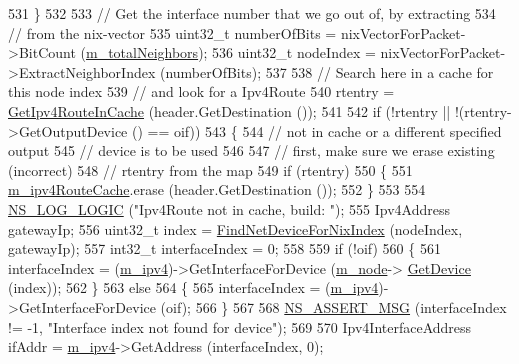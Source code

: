 \begin{DoxyCode}
531         \}
532 
533       \textcolor{comment}{// Get the interface number that we go out of, by extracting}
534       \textcolor{comment}{// from the nix-vector}
535       uint32\_t numberOfBits = nixVectorForPacket->BitCount (\hyperlink{classns3_1_1Ipv4NixVectorRouting_a96620dedcc6c052265c3c53aa14e4f6b}{m\_totalNeighbors});
536       uint32\_t nodeIndex = nixVectorForPacket->ExtractNeighborIndex (numberOfBits);
537 
538       \textcolor{comment}{// Search here in a cache for this node index }
539       \textcolor{comment}{// and look for a Ipv4Route}
540       rtentry = \hyperlink{classns3_1_1Ipv4NixVectorRouting_a1d352caa92d6d91e6cb94ecc31be4411}{GetIpv4RouteInCache} (header.GetDestination ());
541 
542       \textcolor{keywordflow}{if} (!rtentry || !(rtentry->GetOutputDevice () == oif))
543         \{
544           \textcolor{comment}{// not in cache or a different specified output}
545           \textcolor{comment}{// device is to be used}
546 
547           \textcolor{comment}{// first, make sure we erase existing (incorrect)}
548           \textcolor{comment}{// rtentry from the map}
549           \textcolor{keywordflow}{if} (rtentry)
550             \{
551               \hyperlink{classns3_1_1Ipv4NixVectorRouting_aeb85361b66489c60851f72f1493fdee7}{m\_ipv4RouteCache}.erase (header.GetDestination ());
552             \}
553 
554           \hyperlink{group__logging_ga88acd260151caf2db9c0fc84997f45ce}{NS\_LOG\_LOGIC} (\textcolor{stringliteral}{"Ipv4Route not in cache, build: "});
555           Ipv4Address gatewayIp;
556           uint32\_t index = \hyperlink{classns3_1_1Ipv4NixVectorRouting_abbd212141a650d5260455663d59c24c9}{FindNetDeviceForNixIndex} (nodeIndex, gatewayIp);
557           int32\_t interfaceIndex = 0;
558 
559           \textcolor{keywordflow}{if} (!oif)
560             \{
561               interfaceIndex = (\hyperlink{classns3_1_1Ipv4NixVectorRouting_a215cb71f30d85df9ec7176ca22620519}{m\_ipv4})->GetInterfaceForDevice (\hyperlink{classns3_1_1Ipv4NixVectorRouting_a329265b09f4d85bac6ec9bd0ec2daa92}{m\_node}->
      \hyperlink{classns3_1_1Node_a5918dfd24ef632efc9a83a5f6561c76e}{GetDevice} (index));
562             \}
563           \textcolor{keywordflow}{else}
564             \{
565               interfaceIndex = (\hyperlink{classns3_1_1Ipv4NixVectorRouting_a215cb71f30d85df9ec7176ca22620519}{m\_ipv4})->GetInterfaceForDevice (oif);
566             \}
567 
568           \hyperlink{assert_8h_aff5ece9066c74e681e74999856f08539}{NS\_ASSERT\_MSG} (interfaceIndex != -1, \textcolor{stringliteral}{"Interface index not found for device"});
569 
570           Ipv4InterfaceAddress ifAddr = \hyperlink{classns3_1_1Ipv4NixVectorRouting_a215cb71f30d85df9ec7176ca22620519}{m\_ipv4}->GetAddress (interfaceIndex, 0);

\end{DoxyCode}
